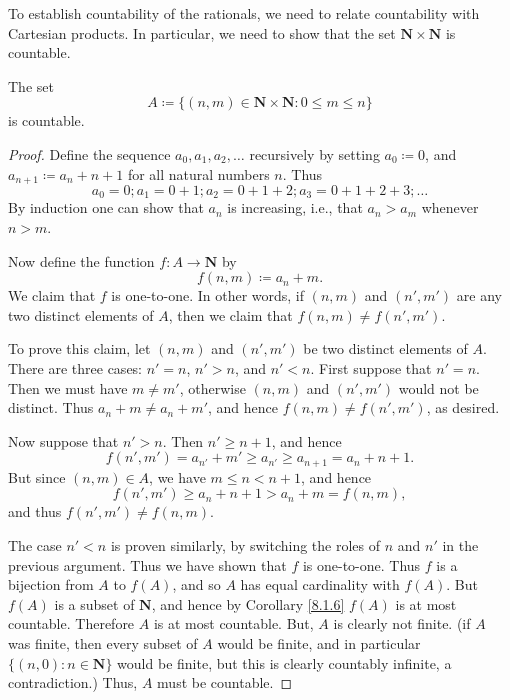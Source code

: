 \begin{note}
    To establish countability of the rationals, we need to relate countability with Cartesian products.
    In particular, we need to show that the set \(\mathbf{N} \times \mathbf{N}\) is countable.
\end{note}

\begin{lemma}\label{8.1.12}
    The set
    \[
        A \coloneqq \{(n, m) \in \mathbf{N} \times \mathbf{N} : 0 \leq m \leq n\}
    \]
    is countable.
\end{lemma}

\begin{proof}
    Define the sequence \(a_0, a_1, a_2, \dots\) recursively by setting \(a_0 \coloneqq 0\), and \(a_{n + 1} \coloneqq a_n + n + 1\) for all natural numbers \(n\).
    Thus
    \[
        a_0 = 0; a_1 = 0 + 1; a_2 = 0 + 1 + 2; a_3 = 0 + 1 + 2 + 3; \dots
    \]
    By induction one can show that \(a_n\) is increasing, i.e., that \(a_n > a_m\) whenever \(n > m\).

    Now define the function \(f : A \to \mathbf{N}\) by
    \[
        f(n, m) \coloneqq a_n + m.
    \]
    We claim that \(f\) is one-to-one.
    In other words, if \((n, m)\) and \((n', m')\) are any two distinct elements of \(A\), then we claim that \(f(n, m) \neq f(n', m')\).

    To prove this claim, let \((n, m)\) and \((n', m')\) be two distinct elements of \(A\).
    There are three cases: \(n' = n\), \(n' > n\), and \(n' < n\).
    First suppose that \(n' = n\).
    Then we must have \(m \neq m'\), otherwise \((n, m)\) and \((n', m')\) would not be distinct.
    Thus \(a_n + m \neq a_n + m'\), and hence \(f(n, m) \neq f(n', m')\), as desired.

    Now suppose that \(n' > n\).
    Then \(n' \geq n + 1\), and hence
    \[
        f(n', m') = a_{n'} + m' \geq a_{n'} \geq a_{n + 1} = a_n + n + 1.
    \]
    But since \((n, m) \in A\), we have \(m \leq n < n + 1\), and hence
    \[
        f(n', m') \geq a_n + n + 1 > a_n + m = f(n, m),
    \]
    and thus \(f(n', m') \neq f(n, m)\).

    The case \(n' < n\) is proven similarly, by switching the roles of \(n\) and \(n'\) in the previous argument.
    Thus we have shown that \(f\) is one-to-one.
    Thus \(f\) is a bijection from \(A\) to \(f(A)\), and so \(A\) has equal cardinality with \(f(A)\).
    But \(f(A)\) is a subset of \(\mathbf{N}\), and hence by Corollary \ref{8.1.6} \(f(A)\) is at most countable.
    Therefore \(A\) is at most countable.
    But, \(A\) is clearly not finite.
    (if \(A\) was finite, then every subset of \(A\) would be finite, and in particular \(\{(n, 0) : n \in \mathbf{N}\}\) would be finite, but this is clearly countably infinite, a contradiction.)
    Thus, \(A\) must be countable.
\end{proof}

